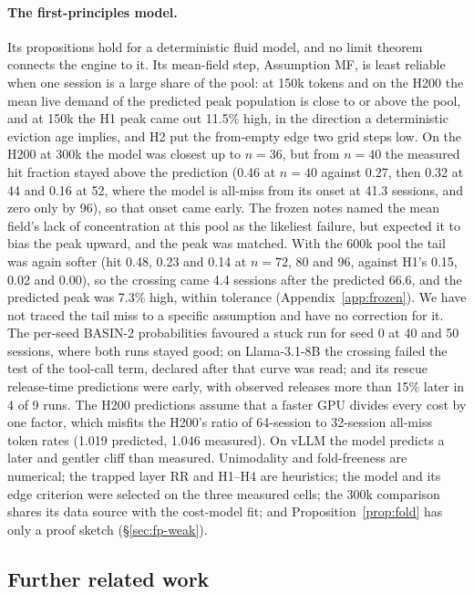 \paragraph{The first-principles model.} Its propositions hold for a deterministic fluid model, and no limit theorem connects the engine to it. Its mean-field step, Assumption MF, is least reliable when one session is a large share of the pool: at 150k tokens and on the H200 the mean live demand of the predicted peak population is close to or above the pool, and at 150k the H1 peak came out 11.5\% high, in the direction a deterministic eviction age implies, and H2 put the from-empty edge two grid steps low. On the H200 at 300k the model was closest up to $n=36$, but from $n=40$ the measured hit fraction stayed above the prediction (0.46 at $n=40$ against 0.27, then 0.32 at 44 and 0.16 at 52, where the model is all-miss from its onset at 41.3 sessions, and zero only by 96), so that onset came early. The frozen notes named the mean field's lack of concentration at this pool as the likeliest failure, but expected it to bias the peak upward, and the peak was matched. With the 600k pool the tail was again softer (hit 0.48, 0.23 and 0.14 at $n=72$, 80 and 96, against H1's 0.15, 0.02 and 0.00), so the crossing came 4.4 sessions after the predicted 66.6, and the predicted peak was 7.3\% high, within tolerance (Appendix~\ref{app:frozen}). We have not traced the tail miss to a specific assumption and have no correction for it. The per-seed BASIN-2 probabilities favoured a stuck run for seed 0 at 40 and 50 sessions, where both runs stayed good; on Llama-3.1-8B the crossing failed the test of the tool-call term, declared after that curve was read; and its rescue release-time predictions were early, with observed releases more than 15\% later in 4 of 9 runs. The H200 predictions assume that a faster GPU divides every cost by one factor, which misfits the H200's ratio of 64-session to 32-session all-miss token rates (1.019 predicted, 1.046 measured). On vLLM the model predicts a later and gentler cliff than measured. Unimodality and fold-freeness are numerical; the trapped layer RR and H1--H4 are heuristics; the model and its edge criterion were selected on the three measured cells; the 300k comparison shares its data source with the cost-model fit; and Proposition~\ref{prop:fold} has only a proof sketch (\S\ref{sec:fp-weak}).

\subsection{Further related work}
